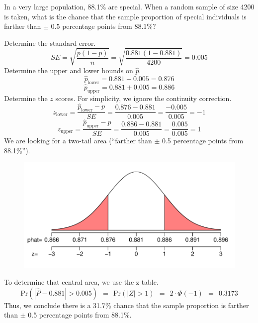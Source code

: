 
\begin{question}
In a very large population, 88.1\% are special. When a random sample of
size 4200 is taken, what is the chance that the sample proportion of
special individuals is farther than \(\pm\) 0.5 percentage points from
88.1\%?
\end{question}

\begin{solution}
Determine the standard error.
\[SE = \sqrt{\frac{p(1-p)}{n}} = \sqrt{\frac{0.881(1-0.881)}{4200}} = 0.005 \]
Determine the upper and lower bounds on \(\hat{p}\).
\[\hat{p}_{\text{lower}} = 0.881-0.005 = 0.876 \]
\[\hat{p}_{\text{upper}} = 0.881+0.005 = 0.886 \] Determine the \(z\)
scores. For simplicity, we ignore the continuity correction.
\[z_{\text{lower}} = \frac{\hat{p}_{\text{lower}}-p}{SE} = \frac{0.876-0.881}{0.005} = 
\frac{-0.005}{0.005} = -1 \]
\[z_{\text{upper}} = \frac{\hat{p}_{\text{upper}}-p}{SE} = \frac{0.886-0.881}{0.005} = \frac{0.005}{0.005} = 1 \]
We are looking for a two-tail area (``farther than \(\pm\) 0.5
percentage points from 88.1\%'').

\begin{figure}[htbp]
\centering
\includegraphics{phat_sampling_outer-1.pdf}
\caption{}
\end{figure}

To determine that central area, we use the z table.
\[\text{Pr}\left(|\hat{P}-0.881| > 0.005\right) ~~=~~ \text{Pr}\left(|Z| > 1\right) ~~=~~ 2\cdot\Phi(-1) ~~=~~ 0.3173 \]
Thus, we conclude there is a 31.7\% chance that the sample proportion is
farther than \(\pm\) 0.5 percentage points from 88.1\%.
\end{solution}

